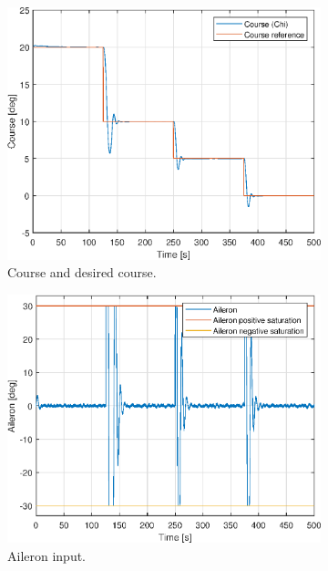 \begin{figure}[ht]
	\centering
	\begin{subfigure}[b]{0.45\textwidth}
		\includegraphics[width=\textwidth]{figures/3f/chi_course.eps}
		\caption{Course and desired course. }
		\label{fig:3f_chi_course}
	\end{subfigure}
	\begin{subfigure}[b]{0.45\textwidth}
		\includegraphics[width=\textwidth]{figures/3f/delta_a_aileron.eps}
		\caption{Aileron input. }
		\label{fig:3f_delta_a_aileron}
	\end{subfigure}
	\begin{subfigure}[b]{0.45\textwidth}

\end{subfigure}
\end{figure}
